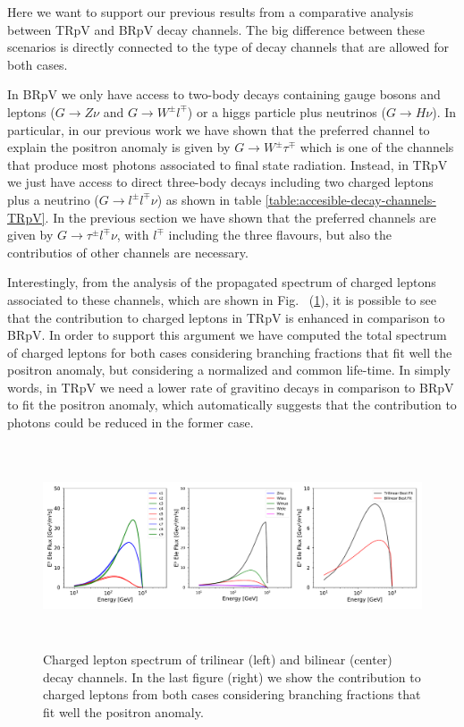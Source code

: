 \documentclass[a4paper,11pt]{article}
\begin{document}
Here we want to support our previous results from a comparative analysis between TRpV and BRpV decay channels. The big difference between these scenarios is directly connected to the type of decay channels that are allowed for both cases. 

In BRpV we only have access to two-body decays containing gauge bosons and leptons ($G\rightarrow Z \nu$ and $G\rightarrow W^{\pm} l^{\mp}$) or a higgs particle plus neutrinos ($G\rightarrow H\nu$). In particular, in our previous work we have shown that the preferred channel to explain the positron anomaly is given by $G\rightarrow W^{\pm} \tau^{\mp}$ which is one of the channels that produce most photons associated to final state radiation. Instead, in TRpV we just have access to direct three-body decays including two charged leptons plus a neutrino ($G\rightarrow l^{\pm} l^{\mp} \nu$) as shown in table \ref{table:accesible-decay-channels-TRpV}. In the previous section we have shown that the preferred channels are given by $G\rightarrow \tau^{\pm} l^{\mp} \nu$, with $l^{\mp}$ including the three flavours, but also the contributios of other channels are necessary.   

Interestingly, from the analysis of the propagated spectrum of charged leptons associated to these channels, which are shown in Fig.~ (\ref{fig:positron-spectrum}), it is possible to see that the contribution to charged leptons in TRpV is enhanced in comparison to BRpV. In order to support this argument we have computed the total spectrum of charged leptons for both cases considering branching fractions that fit well the positron anomaly, but considering a normalized and common life-time. In simply words, in TRpV we need a lower rate of gravitino decays in comparison to BRpV to fit the positron anomaly, which automatically suggests that the contribution to photons could be reduced in the former case.  

\begin{figure}[htb]
\begin{center}
\includegraphics[height=6cm,width=16cm,angle=0]{Figures/exp_plots_electron_flux_comparison.pdf}
\caption{Charged lepton spectrum of trilinear (left) and bilinear (center) decay channels. In the last figure (right) we show the contribution to charged leptons from both cases considering branching fractions that fit well the positron anomaly.}
\label{fig:positron-spectrum}
\end{center}
\end{figure}
\end{document}
